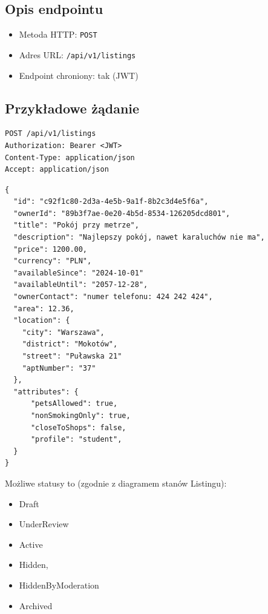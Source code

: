 \documentclass[11pt, a4paper]{article}
\begin{document}
\subsection{Opis endpointu}

\begin{itemize}
    \item Metoda HTTP: \texttt{POST}
    \item Adres URL: \texttt{/api/v1/listings}
    \item Endpoint chroniony: tak (JWT)
\end{itemize}

\subsection{Przykładowe żądanie}

\begin{lstlisting}[style=http,caption={Żądanie HTTP — wystawienie szczegółów ogłoszenia}]
POST /api/v1/listings
Authorization: Bearer <JWT>
Content-Type: application/json
Accept: application/json
\end{lstlisting}

\begin{lstlisting}[style=json,caption={Ciało żądania — wystawienie ogłoszenia}]
{        
  "id": "c92f1c80-2d3a-4e5b-9a1f-8b2c3d4e5f6a",
  "ownerId": "89b3f7ae-0e20-4b5d-8534-126205dcd801",
  "title": "Pokój przy metrze",
  "description": "Najlepszy pokój, nawet karaluchów nie ma",
  "price": 1200.00,
  "currency": "PLN",
  "availableSince": "2024-10-01"
  "availableUntil": "2057-12-28",
  "ownerContact": "numer telefonu: 424 242 424",
  "area": 12.36,
  "location": {
    "city": "Warszawa",
    "district": "Mokotów",
    "street": "Puławska 21"
    "aptNumber": "37"
  },
  "attributes": {
      "petsAllowed": true,
      "nonSmokingOnly": true,
      "closeToShops": false,
      "profile": "student",
  }
}
\end{lstlisting}

Możliwe statusy to (zgodnie z diagramem stanów Listingu):
\begin{itemize}
  \item Draft
  \item UnderReview
  \item Active
  \item Hidden,
  \item HiddenByModeration
  \item Archived
\end{itemize}
\end{document}
